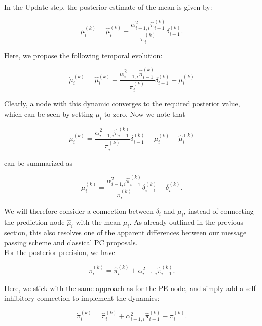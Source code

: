 In the \textsf{Update} step, the posterior estimate of the mean is given by:

\begin{equation}
	\mu_i^{(k)} = \hat{\mu}_i^{(k)} + \frac{\alpha_{i-1,i}^2 \hat{\pi}_{i-1}^{(k)}}{\pi_i^{(k)}} \delta_{i-1}^{(k)}.
\end{equation}

Here, we propose the following temporal evolution:

\begin{equation}
	\dot{\mu}_i^{(k)} = \hat{\mu}_i^{(k)} + \frac{\alpha_{i-1,i}^2 \hat{\pi}_{i-1}^{(k)}}{\pi_i^{(k)}} \delta_{i-1}^{(k)} - \mu_i^{(k)}
\end{equation}

Clearly, a node with this dynamic converges to the required posterior value, which can be seen by setting $\dot{\mu}_i$ to zero. Now we note that

\begin{equation}
	\dot{\mu}_i^{(k)} = \frac{\alpha_{i-1,i}^2 \hat{\pi}_{i-1}^{(k)}}{\pi_i^{(k)}} \delta_{i-1}^{(k)} - \mu_i^{(k)} + \hat{\mu}_i^{(k)}
\end{equation}

can be summarized as 

\begin{equation}
	\dot{\mu}_i^{(k)} = \frac{\alpha_{i-1,i}^2 \hat{\pi}_{i-1}^{(k)}}{\pi_i^{(k)}} \delta_{i-1}^{(k)} - \delta_i^{(k)}.
\end{equation}

We will therefore consider a connection between $\delta_i$ and $\mu_i$, instead of connecting the prediction node $\hat{\mu}_i$ with the mean $\mu_i$. As already outlined in the previous section, this also resolves one of the apparent differences between our message passing scheme and classical PC proposals.\\

For the posterior precision, we have

\begin{equation}
	\pi_i^{(k)} = \hat{\pi}_i^{(k)} + \alpha_{i-1,i}^2 \hat{\pi}_{i-1}^{(k)}.
\end{equation}

Here, we stick with the same approach as for the \textsf{PE} node, and simply add a self-inhibitory connection to implement the dynamics:

\begin{equation}
	\dot{\pi}_i^{(k)} = \hat{\pi}_i^{(k)} + \alpha_{i-1,i}^2 \hat{\pi}_{i-1}^{(k)} - \pi_i^{(k)}.
\end{equation}

